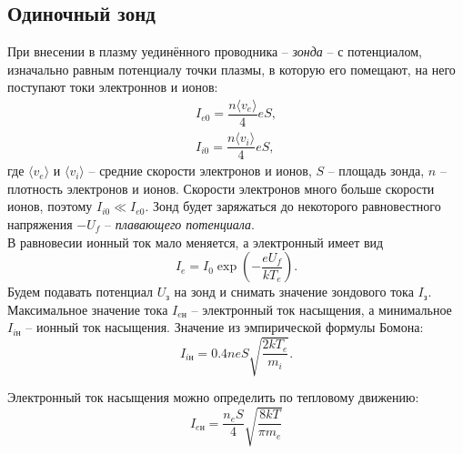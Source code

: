 \documentclass[a4paper, 10pt]{article}
\begin{document}
        \subsection*{Одиночный зонд}
        При внесении в плазму уединённого проводника -- \textit{зонда} -- с потенциалом, изначально равным потенциалу точки плазмы, в которую его помещают, на него поступают токи электроннов и ионов:
        \begin{equation}
                \begin{array}{c}
                        I_{e0} = \dfrac{n \langle v_e \rangle}{4}eS,\\
                        I_{i0} = \dfrac{n \langle v_i \rangle}{4}eS,
                \end{array}
        \end{equation}
        где $\langle v_e \rangle$ и $\langle v_i \rangle$ -- средние скорости электронов и ионов, $S$ -- площадь зонда, $n$ -- плотность электронов и ионов. Скорости электронов много больше скорости ионов, поэтому $I_{i0} \ll I_{e0}$. Зонд будет заряжаться до некоторого равновестного напряжения $-U_f$ -- \textit{плавающего потенциала}.\\
        В равновесии ионный ток мало меняется, а электронный имеет вид
        $$
        I_e = I_0 \exp\left( -\dfrac{eU_f}{kT_e} \right).
        $$
        Будем подавать потенциал $U_\text{з}$ на зонд и снимать значение зондового тока $I_\text{з}$. Максимальное значение тока $I_{e\text{н}}$ -- электронный ток насыщения, а минимальное $I_{i\text{н}}$ -- ионный ток насыщения. Значение из эмпирической формулы Бомона:
        \begin{equation}
                I_{i\text{н}} = 0.4 neS \sqrt{\dfrac{2kT_e}{m_i}}.
        \end{equation}

        Электронный ток насыщения можно определить по тепловому движению:
        \[I_{e\text{н}} = \frac{n_eS}{4}\sqrt{\frac{8kT}{\pi m_e}}\]
\end{document}
